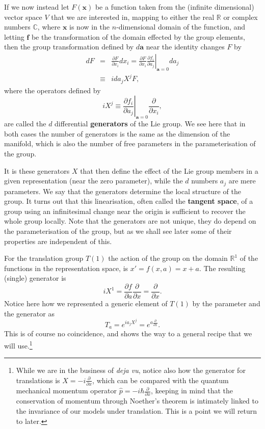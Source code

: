 \documentclass[notes.tex]{subfiles}
\begin{document}
If we now instead let $F(\mathbf x)$ be a function taken from the (infinite dimensional) vector space $V$ that we are interested in, mapping to either the real $\mathbb{R}$ or complex numbers $\mathbb{C}$, where $\mathbf x$ is now in the $n$-dimensional domain of the function, and letting $\mathbf f$ be the transformation of the domain effected by the group elements, then the group transformation defined by $d\mathbf a$ near the identity changes $F$  by
\begin{eqnarray*}
dF &=& \frac{\partial F}{\partial x_i}dx_i = \frac{\partial F}{\partial x_i}\left.\frac{\partial f_i}{\partial a_j}\right|_{\mathbf a=0}da_j\\
&\equiv& i da_j X^j F,
\end{eqnarray*}
where the operators defined by 
\begin{equation}
iX^j \equiv\left.\frac{\partial f_i}{\partial a_j} \right|_{\mathbf a=0}\frac{\partial }{\partial x_i},
\end{equation}
are called the $d$ differential {\bf generators} of the Lie group. We see here that in both cases the number of generators is the same as the dimension of the manifold, which is also the number of free parameters in the parameterisation of the group.

It is these generators $X$ that then define the effect of the Lie group members in a given representation (near the zero parameter), while the $d$ numbers $a_j$ are mere parameters. We say that the generators determine the local structure of the group. It turns out that this linearisation, often called the {\bf tangent space}, of a group using an infinitesimal change near the origin is sufficient to recover the whole group locally. Note that the generators are not unique, they do depend on the parameterisation of the group, but as we shall see later some of their properties are independent of this.

For the translation group $T(1)$ the action of the group on the domain $\mathbb{R}^1$ of the functions in the representation space, is $x'=f(x,a) = x+a$. The resulting (single) generator is
\[ iX^1=\frac{\partial f}{\partial a} \frac{\partial}{\partial x}= \frac{\partial}{\partial x}. \]
Notice here how we represented a generic element of $T(1)$ by the parameter and the generator as
\[ T_a=e^{ia_j X^j}=e^{a \frac{\partial}{\partial x}}. \]
This is of course no coincidence, and shows the way to a general recipe that we will use.\footnote{While we are in the business of {\it deja vu}, notice also how the generator for translations is $X=-i \frac{\partial}{\partial x}$, which can be compared with the quantum mechanical momentum operator $\hat p=-i\hbar \frac{\partial}{\partial x}$, keeping in mind that the conservation of momentum through Noether's theorem is intimately linked to the invariance of our models under translation. This is a point we will return to later.}
\end{document}
